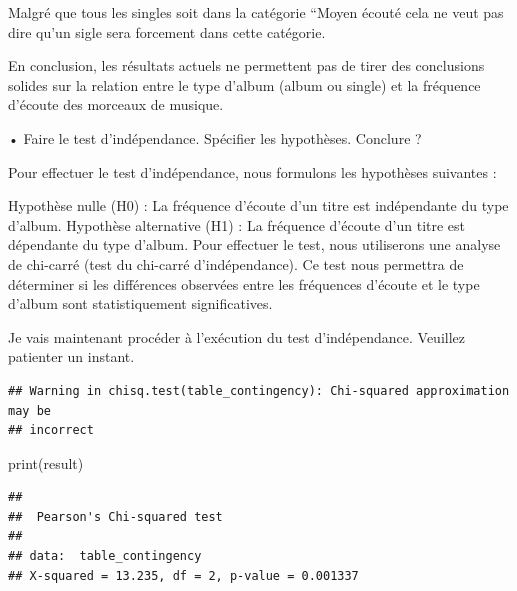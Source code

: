 \documentclass[
]{article}
\newenvironment{Shaded}{\begin{snugshade}}{\end{snugshade}}
\newcommand{\CommentTok}[1]{\textcolor[rgb]{0.56,0.35,0.01}{\textit{#1}}}
\newcommand{\FunctionTok}[1]{\textcolor[rgb]{0.00,0.00,0.00}{#1}}
\newcommand{\NormalTok}[1]{#1}
\newcommand{\OtherTok}[1]{\textcolor[rgb]{0.56,0.35,0.01}{#1}}
\newcommand{\SpecialCharTok}[1]{\textcolor[rgb]{0.00,0.00,0.00}{#1}}
\begin{document}
Malgré que tous les singles soit dans la catégorie ``Moyen écouté cela
ne veut pas dire qu'un sigle sera forcement dans cette catégorie.

En conclusion, les résultats actuels ne permettent pas de tirer des
conclusions solides sur la relation entre le type d'album (album ou
single) et la fréquence d'écoute des morceaux de musique.

• Faire le test d'indépendance. Spécifier les hypothèses. Conclure ?

Pour effectuer le test d'indépendance, nous formulons les hypothèses
suivantes :

Hypothèse nulle (H0) : La fréquence d'écoute d'un titre est indépendante
du type d'album. Hypothèse alternative (H1) : La fréquence d'écoute d'un
titre est dépendante du type d'album. Pour effectuer le test, nous
utiliserons une analyse de chi-carré (test du chi-carré d'indépendance).
Ce test nous permettra de déterminer si les différences observées entre
les fréquences d'écoute et le type d'album sont statistiquement
significatives.

Je vais maintenant procéder à l'exécution du test d'indépendance.
Veuillez patienter un instant.

\begin{Shaded}
\end{Shaded}

\begin{verbatim}
## Warning in chisq.test(table_contingency): Chi-squared approximation may be
## incorrect
\end{verbatim}

\begin{Shaded}
\begin{Highlighting}[]
\FunctionTok{print}\NormalTok{(result)}
\end{Highlighting}
\end{Shaded}

\begin{verbatim}
## 
##  Pearson's Chi-squared test
## 
## data:  table_contingency
## X-squared = 13.235, df = 2, p-value = 0.001337
\end{verbatim}
\end{document}
